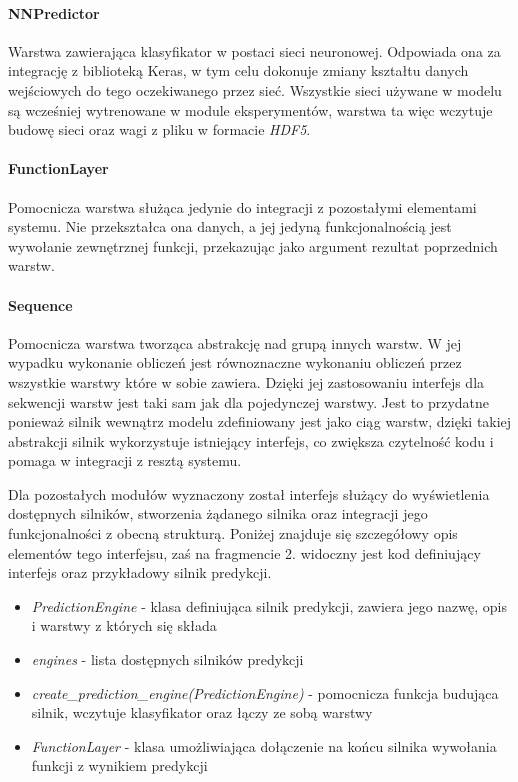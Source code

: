 \documentclass[polish,12pt]{aghthesis}
\begin{document}
\paragraph{NNPredictor} Warstwa zawierająca klasyfikator w postaci sieci neuronowej. Odpowiada ona za integrację z biblioteką Keras, w tym celu dokonuje zmiany kształtu danych wejściowych do tego oczekiwanego przez sieć. Wszystkie sieci używane w modelu są wcześniej wytrenowane w module eksperymentów, warstwa ta więc wczytuje budowę sieci oraz wagi z pliku w formacie \emph{HDF5}. %

\paragraph{FunctionLayer} Pomocnicza warstwa służąca jedynie do integracji z pozostałymi elementami systemu. Nie przekształca ona danych, a jej jedyną funkcjonalnością jest wywołanie zewnętrznej funkcji, przekazując jako argument rezultat poprzednich warstw.

\paragraph{Sequence} Pomocnicza warstwa tworząca abstrakcję nad grupą innych warstw. W jej wypadku wykonanie obliczeń jest równoznaczne wykonaniu obliczeń przez wszystkie warstwy które w sobie zawiera. Dzięki jej zastosowaniu interfejs dla sekwencji warstw jest taki sam jak dla pojedynczej warstwy. Jest to przydatne ponieważ silnik wewnątrz modelu zdefiniowany jest jako ciąg warstw, dzięki takiej abstrakcji silnik wykorzystuje istniejący interfejs, co zwiększa czytelność kodu i pomaga w integracji z resztą systemu.

Dla pozostałych modułów wyznaczony został interfejs służący do wyświetlenia dostępnych silników, stworzenia żądanego silnika oraz integracji jego funkcjonalności z obecną strukturą. Poniżej znajduje się szczegółowy opis elementów tego interfejsu, zaś na fragmencie 2. widoczny jest kod definiujący interfejs oraz przykładowy silnik predykcji.

\begin{itemize}
	\itemsep0em
	\item[] \emph{PredictionEngine} - klasa definiująca silnik predykcji, zawiera jego nazwę, opis i warstwy z których się składa
	\item[] \emph{engines} - lista dostępnych silników predykcji
	\item[] \emph{create\_prediction\_engine(PredictionEngine)} - pomocnicza funkcja budująca silnik, wczytuje klasyfikator oraz łączy ze sobą warstwy
	\item[] \emph{FunctionLayer} - klasa umożliwiająca dołączenie na końcu silnika wywołania funkcji z wynikiem predykcji
\end{itemize}
\end{document}

